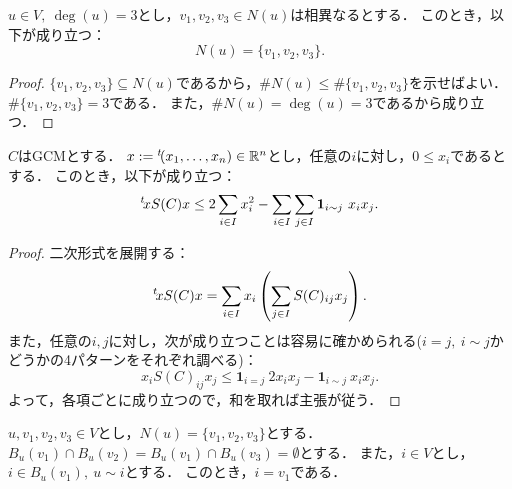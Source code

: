 \begin{lemma}
  \label{lem:neighborSet_eq_triple}
  \leanok
  \uses{}
  $u \in V,\ \deg(u) = 3$とし，$v_1, v_2, v_3 \in N(u)$は相異なるとする．
  このとき，以下が成り立つ：
  \begin{equation}
    N(u) = \{v_1, v_2, v_3\}.
  \end{equation}
\end{lemma}

\begin{proof}
  $\{v_1, v_2, v_3\} \subseteq N(u)$であるから，$\# N(u) \le \# \{v_1, v_2, v_3\}$を示せばよい．
  $\# \{v_1, v_2, v_3\} = 3$である．
  また，$\# N(u) = \deg(u) = 3$であるから成り立つ．
\end{proof}

\begin{lemma}
  \label{lem:form_le_Gadj}
  \leanok
  \uses{}
  $C$はGCMとする．
  $x := {}^t\!(x_1, \ldots, x_n) \in \mathbb{R}^n$とし，任意の$i$に対し，$0 \le x_i$であるとする．
  このとき，以下が成り立つ：
  \begin{equation}
    {}^t\!x S(C) x
    \le 2 \sum_{i \in I} x_i ^ 2 - \sum_{i \in I} \sum_{j \in I} \bm{1}_{i \sim j}\ x_i x_j.
  \end{equation}
\end{lemma}

\begin{proof}
  二次形式を展開する：
  \begin{equation}
    {}^t\!x S(C) x
    = \sum_{i \in I} x_i \left( \sum_{j \in I} S(C)_{ij} x_j \right).
  \end{equation}
  また，任意の$i, j$に対し，次が成り立つことは容易に確かめられる($i = j,\ i \sim j$かどうかの4パターンをそれぞれ調べる)：
  \begin{equation}
    x_i S(C)_{ij} x_j
    \le \bm{1}_{i = j}\ 2 x_i x_j - \bm{1}_{i \sim j}\ x_i x_j.
  \end{equation}
  よって，各項ごとに成り立つので，和を取れば主張が従う．
\end{proof}

\begin{lemma}
  \label{lem:only_neighbor_in_branch}
  \leanok
  \uses{}
  $u, v_1, v_2, v_3 \in V$とし，$N(u) = \{v_1, v_2, v_3\}$とする．
  $B_u(v_1) \cap B_u(v_2) = B_u(v_1) \cap B_u(v_3) = \emptyset$とする．
  また，$i \in V$とし，$i \in B_u(v_1),\ u \sim i$とする．
  このとき，$i = v_1$である．
\end{lemma}


